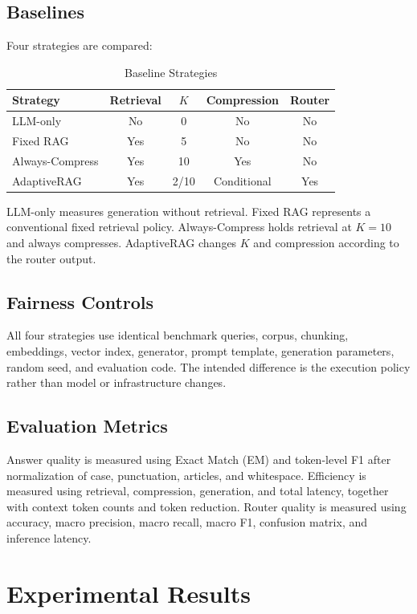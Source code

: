 \documentclass[conference]{IEEEtran}
\begin{document}
\subsection{Baselines}
Four strategies are compared:

\begin{table}[t]
\centering
\small
\caption{Baseline Strategies}
\label{tab:baselines}
\begin{tabular}{lcccc}
\toprule
Strategy & Retrieval & $K$ & Compression & Router\\
\midrule
LLM-only & No & 0 & No & No\\
Fixed RAG & Yes & 5 & No & No\\
Always-Compress & Yes & 10 & Yes & No\\
AdaptiveRAG & Yes & 2/10 & Conditional & Yes\\
\bottomrule
\end{tabular}
\end{table}

LLM-only measures generation without retrieval. Fixed RAG represents a conventional fixed retrieval policy. Always-Compress holds retrieval at $K=10$ and always compresses. AdaptiveRAG changes $K$ and compression according to the router output.

\subsection{Fairness Controls}
All four strategies use identical benchmark queries, corpus, chunking, embeddings, vector index, generator, prompt template, generation parameters, random seed, and evaluation code. The intended difference is the execution policy rather than model or infrastructure changes.

\subsection{Evaluation Metrics}
Answer quality is measured using Exact Match (EM) and token-level F1 after normalization of case, punctuation, articles, and whitespace. Efficiency is measured using retrieval, compression, generation, and total latency, together with context token counts and token reduction. Router quality is measured using accuracy, macro precision, macro recall, macro F1, confusion matrix, and inference latency.

\section{Experimental Results}
\end{document}
